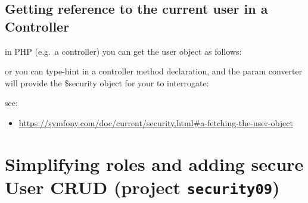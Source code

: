 \documentclass[a4paperpaper,openright]{book}
\newenvironment{Shaded}{}{}
\newcommand{\KeywordTok}[1]{\textcolor[rgb]{0.00,0.44,0.13}{\textbf{#1}}}
\newcommand{\NormalTok}[1]{#1}
\newcommand{\OtherTok}[1]{\textcolor[rgb]{0.00,0.44,0.13}{#1}}
\providecommand{\tightlist}{%
  \setlength{\itemsep}{0pt}\setlength{\parskip}{0pt}}
\begin{document}
\hypertarget{getting-reference-to-the-current-user-in-a-controller}{%
\section{Getting reference to the current user in a
Controller}\label{getting-reference-to-the-current-user-in-a-controller}}

in PHP (e.g.~a controller) you can get the user object as follows:

\begin{Shaded}
\end{Shaded}

or you can type-hint in a controller method declaration, and the param
converter will provide the \$security object for your to interrogate:

\begin{Shaded}
\end{Shaded}

see:

\begin{itemize}
\tightlist
\item
  \url{https://symfony.com/doc/current/security.html\#a-fetching-the-user-object}
\end{itemize}

\hypertarget{simplifying-roles-and-adding-secure-user-crud-project-security09}{%
\chapter{\texorpdfstring{Simplifying roles and adding secure User CRUD
(project
\texttt{security09})}{Simplifying roles and adding secure User CRUD (project security09)}}\label{simplifying-roles-and-adding-secure-user-crud-project-security09}}
\end{document}
